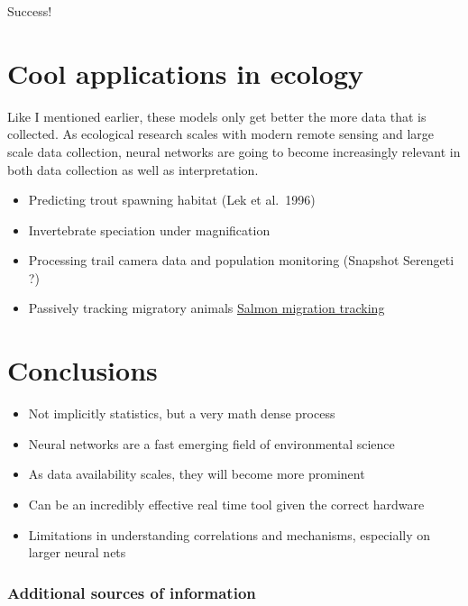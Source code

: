\documentclass[
]{article}
\providecommand{\tightlist}{%
  \setlength{\itemsep}{0pt}\setlength{\parskip}{0pt}}
\begin{document}
Success!

\hypertarget{cool-applications-in-ecology}{%
\section{Cool applications in
ecology}\label{cool-applications-in-ecology}}

Like I mentioned earlier, these models only get better the more data
that is collected. As ecological research scales with modern remote
sensing and large scale data collection, neural networks are going to
become increasingly relevant in both data collection as well as
interpretation.

\begin{itemize}
\tightlist
\item
  Predicting trout spawning habitat (Lek et al.~1996)
\item
  Invertebrate speciation under magnification
\item
  Processing trail camera data and population monitoring (Snapshot
  Serengeti ?)
\item
  Passively tracking migratory animals
  \href{https://github.com/keaneflynn/LOTIC}{Salmon migration tracking}
\end{itemize}

\hypertarget{conclusions}{%
\section{Conclusions}\label{conclusions}}

\begin{itemize}
\tightlist
\item
  Not implicitly statistics, but a very math dense process
\item
  Neural networks are a fast emerging field of environmental science
\item
  As data availability scales, they will become more prominent
\item
  Can be an incredibly effective real time tool given the correct
  hardware
\item
  Limitations in understanding correlations and mechanisms, especially
  on larger neural nets
\end{itemize}

\hypertarget{additional-sources-of-information}{%
\subsubsection{Additional sources of
information}\label{additional-sources-of-information}}
\end{document}
